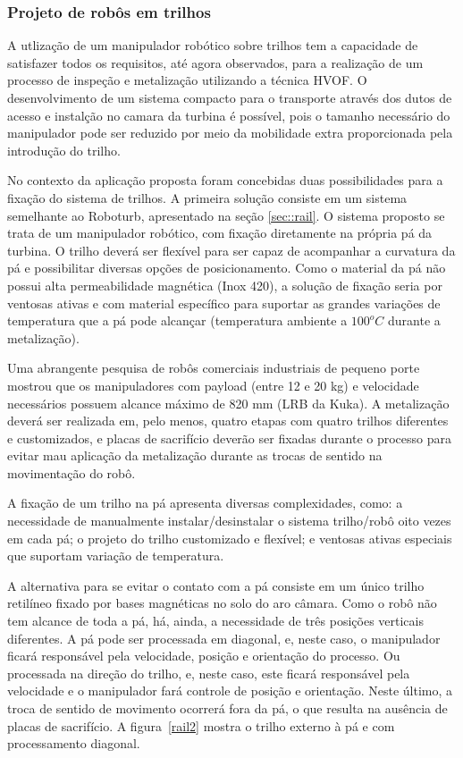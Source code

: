 \subsubsection{Projeto de robôs em trilhos}\label{proj_rail}
 
A utlização de um manipulador robótico sobre trilhos tem a
capacidade de satisfazer todos os requisitos, até agora observados, para a realização de um
processo de inspeção e metalização utilizando a técnica HVOF. O desenvolvimento
de um sistema compacto para o transporte através dos dutos de acesso e instalção
no camara da turbina é possível, pois o tamanho necessário do manipulador pode
ser reduzido por meio da mobilidade extra proporcionada pela introdução do
trilho.

No contexto da aplicação proposta foram concebidas duas possibilidades para a
fixação do sistema de trilhos. A primeira solução consiste em um sistema
semelhante ao Roboturb, apresentado na seção \ref{sec::rail}. O sistema proposto
se trata de um manipulador robótico, com fixação diretamente na própria pá da
turbina. O trilho deverá ser flexível para ser capaz de acompanhar a curvatura
da pá e possibilitar diversas opções de posicionamento. Como o material da pá
não possui alta permeabilidade magnética (Inox 420), a solução de fixação seria
por ventosas ativas e com material específico para suportar as grandes
variações de temperatura que a pá pode alcançar (temperatura ambiente a
$100^oC$ durante a metalização).

Uma abrangente pesquisa de robôs comerciais industriais de pequeno porte mostrou
que os manipuladores com payload (entre 12 e 20 kg) e velocidade necessários
possuem alcance máximo de 820 mm (LRB da Kuka). A metalização deverá ser
realizada em, pelo menos, quatro etapas com quatro trilhos diferentes e
customizados, e placas de sacrifício deverão ser fixadas durante o
processo para evitar mau aplicação da metalização durante as trocas de sentido
na movimentação do robô. 

A fixação de um trilho na pá apresenta diversas complexidades, como: a
necessidade de manualmente instalar/desinstalar o sistema trilho/robô oito vezes
em cada pá; o projeto do trilho customizado e flexível; e ventosas ativas
especiais que suportam variação de temperatura.

A alternativa para se evitar o contato com a pá consiste em um único trilho
retilíneo fixado por bases magnéticas no solo do aro câmara. Como o robô não
tem alcance de toda a pá, há, ainda, a necessidade de três posições verticais
diferentes. A pá pode ser processada em diagonal, e, neste caso, o manipulador
ficará responsável pela velocidade, posição e orientação do processo. Ou processada na
direção do trilho, e, neste caso, este ficará responsável pela velocidade e o
manipulador fará controle de posição e orientação. Neste último, a troca de
sentido de movimento ocorrerá fora da pá, o que resulta na ausência de placas de
sacrifício. A figura~\ref{rail2} mostra o trilho externo à pá e com
processamento diagonal.

